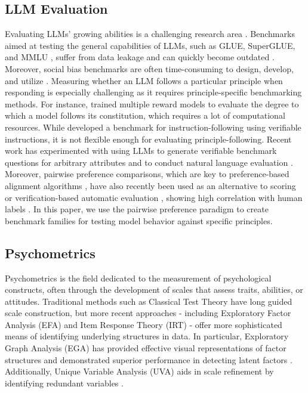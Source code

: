 \subsection{LLM Evaluation}
Evaluating LLMs' growing abilities is a challenging research area \cite{bowman2021will,ganguli2023challenges, blodgett2021stereotyping,anwar2024foundational}. Benchmarks aimed at testing the general capabilities of LLMs, such as GLUE, SuperGLUE, and MMLU \cite{wang2018glue, wang2019superglue, hendrycks2020measuring}, suffer from data leakage and can quickly become outdated \cite{deng2023investigating}. 
Moreover, social bias benchmarks are often time-consuming to design, develop, and utilize \cite{blodgett2020language, parrish2021bbq,ganguli2023challenges,santurkar2023whose}. 
Measuring whether an LLM follows a particular principle when responding is especially challenging as it requires principle-specific benchmarking methods. For instance, \citet{kundu2023specific} trained multiple reward models to evaluate the degree to which a model follows its constitution, which requires a lot of computational resources. While \citet{zhou2023instruction} developed a benchmark for instruction-following using verifiable instructions, it is not flexible enough for evaluating principle-following. Recent work has experimented with using LLMs to generate verifiable benchmark questions for arbitrary attributes \cite{perez2023discovering} and to conduct natural language evaluation \cite{wang2023chatgpt,wang2023largelm}. Moreover, pairwise preference comparisons, which are key to preference-based alignment algorithms \cite{ouyang2022training}, have also recently been used as an alternative to scoring or verification-based automatic evaluation \cite{qin2023large,liu2024aligning,zhou2024fairer}, showing high correlation with human labels \cite{wang2023largelm}. In this paper, we use the pairwise preference paradigm to create benchmark families \cite{sorensen2024roadmap} for testing model behavior against specific principles.

\subsection{Psychometrics} 
Psychometrics is the field dedicated to the measurement of psychological constructs, often through the development of scales that assess traits, abilities, or attitudes. Traditional methods such as Classical Test Theory \cite{devellis2006classical} have long guided scale construction, but more recent approaches - including Exploratory Factor Analysis (EFA) \cite{fabrigar2012exploratory} and Item Response Theory (IRT) \cite{embretson2013item} - offer more sophisticated means of identifying underlying structures in data. In particular, Exploratory Graph Analysis (EGA) \cite{ega1} has provided effective visual representations of factor structures and demonstrated superior performance in detecting latent factors \cite{ega2,golino2022exploratory}. Additionally, Unique Variable Analysis (UVA) aids in scale refinement by identifying redundant variables \cite{uva}. 



